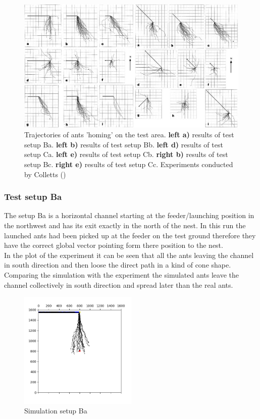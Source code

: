 \documentclass[11pt]{article}
\begin{document}
\begin{figure}[H]
	\centering
	\includegraphics[width=1\textwidth]{p1-2.png}
	\caption{Trajectories of ants 'homing' on the test area. \textbf{left a)} results of test setup Ba. \textbf{left b)} results of test setup Bb. \textbf{left d)} results of test setup Ca.  \textbf{left e)} results of test setup Cb. \textbf{right b)} results of test setup Bc.  \textbf{right e)} results of test setup Cc. Experiments conducted by Colletts (\cite{wehner})}
	\label{fig:results experiment test B and C}
\end{figure}

	\subsubsection{Test setup Ba}
		The setup Ba is a horizontal channel starting at the feeder/launching position in the northwest and has its exit exactly in the north of the nest. In this run the launched ants had been picked up at the feeder on the test ground therefore they have the correct global vector pointing form there position to the nest. \\
In the plot of the experiment it can be seen that all the ants leaving the channel in south direction and then loose the direct path in a kind of cone shape. Comparing the simulation with the experiment the simulated ants leave the channel collectively in south direction and spread later than the real ants.

\begin{figure}[H]
	\centering
	\includegraphics[width=0.5\textwidth]{test_Ba.png}
	\caption{Simulation setup Ba}
	\label{fig:Ba}

\end{figure}
\end{document}
